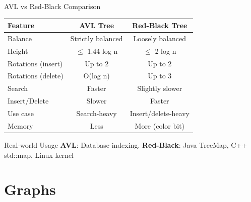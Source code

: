 \documentclass[aspectratio=169,xcolor=dvipsnames]{beamer}
\begin{document}
\begin{frame}{AVL vs Red-Black Comparison}
  \begin{table}
    \centering
    \begin{tabular}{l|c|c}
      \toprule
      \textbf{Feature} & \textbf{AVL Tree} & \textbf{Red-Black Tree} \\
      \midrule
      Balance & Strictly balanced & Loosely balanced \\
      Height & $\leq$ 1.44 log n & $\leq$ 2 log n \\
      Rotations (insert) & Up to 2 & Up to 2 \\
      Rotations (delete) & O(log n) & Up to 3 \\
      Search & Faster & Slightly slower \\
      Insert/Delete & Slower & Faster \\
      Use case & Search-heavy & Insert/delete-heavy \\
      Memory & Less & More (color bit) \\
      \bottomrule
    \end{tabular}
  \end{table}

  \vspace{0.3cm}

  \begin{exampleblock}{Real-world Usage}
    \textbf{AVL}: Database indexing. \textbf{Red-Black}: Java TreeMap, C++ std::map, Linux kernel
  \end{exampleblock}
\end{frame}

\section{Graphs}
\end{document}
